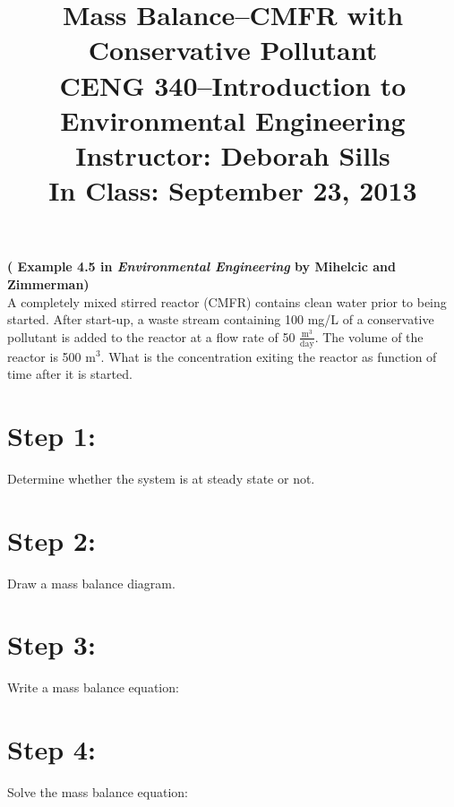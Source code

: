 \documentclass[11pt,letterpaper]{article}
\begin{document}
\setlength{\parindent}{0cm} 



\frenchspacing

\setlength{\textwidth}{6.25in}

\title {\Large{\textbf{Mass Balance--CMFR with Conservative Pollutant}}\\ \large{CENG 340--Introduction to Environmental Engineering\\
Instructor: Deborah Sills\\ \textbf{In Class: September 23, 2013}}}

\author {}
\date {}
\maketitle

\vspace{-1.5cm}


\textbf{( Example 4.5 in \emph{Environmental Engineering} by Mihelcic and Zimmerman)}\\

A completely mixed stirred reactor (CMFR) contains clean water prior to being started.  After start-up, a waste stream containing 100 mg/L of a conservative pollutant is added to the reactor at a flow rate of 50 $\mathrm{\frac{m^3}{day}}$.  The volume of the reactor is 500 m$^3$. What is the concentration exiting the reactor as function of time after it is started.


\section *{Step 1:} 
Determine whether the system is at steady state or not.

\vspace{0.2in}

\section *{Step 2:} 
Draw a mass balance diagram.

\vspace{1.5in}

\section *{Step 3:}
Write a mass balance equation:

\vspace{0.8in}
\section *{Step 4:} 
Solve the mass balance equation:
\end{document}
